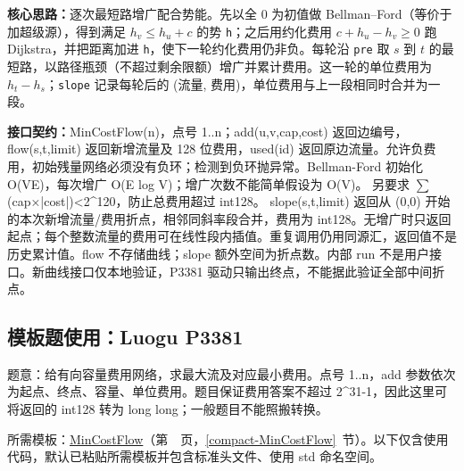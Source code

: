 \textbf{核心思路：}\allowbreak 逐次最短路增广配合势能。先以全 0 为初值做 Bellman–Ford（等价于加超级源），得到满足 $h_v\le h_u+c$ 的势 \texttt{h}；之后用约化费用 $c+h_u-h_v\ge0$ 跑 Dijkstra，并把距离加进 \texttt{h}，使下一轮约化费用仍非负。每轮沿 \texttt{pre} 取 $s$ 到 $t$ 的最短路，以路径瓶颈（不超过剩余限额）增广并累计费用。这一轮的单位费用为 $h_t-h_s$；\texttt{slope} 记录每轮后的 (流量, 费用)，单位费用与上一段相同时合并为一段。



{\sloppy{}\noindent\textbf{接口契约：}MinCostFlow(n)，点号 1..n；add(u,v,cap,cost) 返回边编号，flow(s,t,limit) 返回新增流量及 128 位费用，used(id) 返回原边流量。允许负费用，初始残量网络必须没有负环；检测到负环抛异常。Bellman-Ford 初始化 O(VE)，每次增广 O(E log V)；增广次数不能简单假设为 O(V)。 另要求 $\sum$(cap×|cost|)<2\textasciicircum{}120，防止总费用超过 int128。 slope(s,t,limit) 返回从 (0,0) 开始的本次新增流量/费用折点，相邻同斜率段合并，费用为 int128。无增广时只返回起点；每个整数流量的费用可在线性段内插值。重复调用仍用同源汇，返回值不是历史累计值。flow 不存储曲线；slope 额外空间为折点数。内部 run 不是用户接口。新曲线接口仅本地验证，P3381 驱动只输出终点，不能据此验证全部中间折点。\par}

\Needspace{426pt}



\newpage



\newpage



\Needspace{365pt}

\subsection*{模板题使用：Luogu P3381}

\label{usage-example-55}

题意：给有向容量费用网络，求最大流及对应最小费用。点号 1..n，add 参数依次为起点、终点、容量、单位费用。题目保证费用答案不超过 2\textasciicircum{}31-1，因此这里可将返回的 int128 转为 long long；一般题目不能照搬转换。

所需模板：\hyperref[compact-MinCostFlow]{MinCostFlow}（第~\pageref{compact-MinCostFlow}~页，\ref{compact-MinCostFlow}~节）。以下仅含使用代码，默认已粘贴所需模板并包含标准头文件、使用 std 命名空间。

